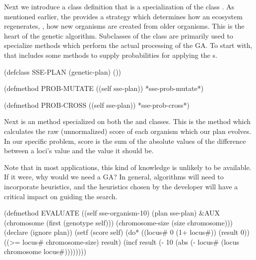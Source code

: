 {\samepage
	
Next we introduce a class definition that is a specialization of the class .
As mentioned earlier, the  provides a strategy which determines how an ecosystem
regenerates, \ie, how new organisms are created from older organisms. This is the
heart of the genetic algorithm. Subclasses of the class  are
primarily used to specialize methods which perform the actual processing of the GA. To start with,
that includes some methods to supply probabilities for applying the s.
\begin{clcode}(defclass SSE-PLAN (genetic-plan)
  ())

(defmethod PROB-MUTATE ((self sse-plan))
  *sse-prob-mutate*)

(defmethod PROB-CROSS ((self sse-plan))
  *sse-prob-cross*)\end{clcode}

}%

\filbreak


Next is an  method specialized on both the 
and  classes. This is the method which calculates the
raw (unnormalized) score of each organism which our plan evolves. In our specific
problem, score is the sum of the absolute values of the difference between a loci's
value and the value it should be.

\filbreak

{\samepage

Note that in most applications, this kind of knowledge
is unlikely to be available. If it were, why would we need a GA? In general,
 algorithms will need to incorporate heuristics, and the
heuristics chosen by the developer will have a critical impact on guiding the
search.
\begin{clcode}(defmethod EVALUATE ((self sse-organism-10) (plan sse-plan) &AUX
                     (chromosome (first (genotype self)))
                     (chromosome-size (size chromosome)))
  (declare (ignore plan))
  (setf (score self)
  (do* ((locus# 0 (1+ locus#))
        (result 0))
       ((>= locus# chromosome-size)
        result)
    (incf result (- 10 (abs (- locus# (locus chromosome locus#))))))))\end{clcode}

}%

\filbreak

